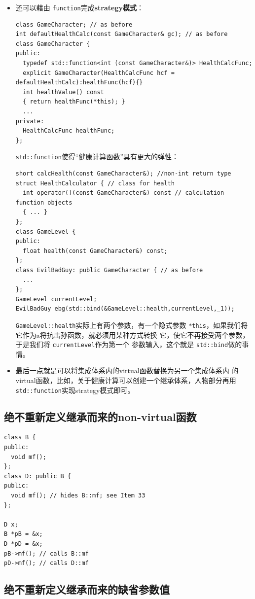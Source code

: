 \documentclass[a4paper,twoside]{article}
\theoremstyle{definition}
\theoremstyle{remark}
\numberwithin{equation}{section}
\let\OldTexttt\texttt
\renewcommand{\texttt}[1]{{\color{blue} \OldTexttt{#1}}}
\begin{document}
\begin{itemize}
\item 还可以藉由\texttt{function}完成\textbf{strategy模式}：
\begin{verbatim}
class GameCharacter; // as before
int defaultHealthCalc(const GameCharacter& gc); // as before
class GameCharacter {
public:
  typedef std::function<int (const GameCharacter&)> HealthCalcFunc;
  explicit GameCharacter(HealthCalcFunc hcf = defaultHealthCalc):healthFunc(hcf){}
  int healthValue() const
  { return healthFunc(*this); }
  ...
private:
  HealthCalcFunc healthFunc;
};
\end{verbatim}
  \texttt{std::function}使得“健康计算函数”具有更大的弹性：
\begin{verbatim}
short calcHealth(const GameCharacter&); //non-int return type
struct HealthCalculator { // class for health
  int operator()(const GameCharacter&) const // calculation function objects
  { ... }
};
class GameLevel {
public:
  float health(const GameCharacter&) const;
}; 
class EvilBadGuy: public GameCharacter { // as before
  ...
};
GameLevel currentLevel;
EvilBadGuy ebg(std::bind(&GameLevel::health,currentLevel,_1));
\end{verbatim}
  \texttt{GameLevel::health}实际上有两个参数，有一个隐式参数
  \texttt{*this}，如果我们将它作为a将抗击孙函数，就必须用某种方式转换
  它，使它不再接受两个参数，于是我们将\texttt{currentLevel}作为第一个
  参数输入，这个就是\texttt{std::bind}做的事情。
\item 最后一点就是可以将集成体系内的virtual函数替换为另一个集成体系内
  的virtual函数，比如，关于健康计算可以创建一个继承体系，人物部分再用
  \texttt{std::function}实现strategy模式即可。
\end{itemize}

\subsection{绝不重新定义继承而来的non-virtual函数}
\label{sec:Item-36}
\begin{verbatim}
class B {
public:
  void mf();
};
class D: public B {
public:
  void mf(); // hides B::mf; see Item 33
};

D x;
B *pB = &x;
D *pD = &x;
pB->mf(); // calls B::mf
pD->mf(); // calls D::mf
\end{verbatim}

\subsection{绝不重新定义继承而来的缺省参数值}
\label{sec:Item-37}
\end{document}
